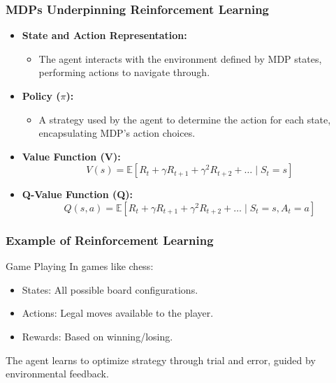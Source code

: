 \documentclass[aspectratio=169]{beamer}
\begin{document}
\begin{frame}[fragile]
    \frametitle{MDPs Underpinning Reinforcement Learning}
    \begin{itemize}
        \item \textbf{State and Action Representation:}
        \begin{itemize}
            \item The agent interacts with the environment defined by MDP states, performing actions to navigate through.
        \end{itemize}

        \item \textbf{Policy ($\pi$):}
        \begin{itemize}
            \item A strategy used by the agent to determine the action for each state, encapsulating MDP's action choices.
        \end{itemize}

        \item \textbf{Value Function (V):}
        \begin{equation}
        V(s) = \mathbb{E} \left[ R_t + \gamma R_{t+1} + \gamma^2 R_{t+2} + \ldots \mid S_t = s \right]
        \end{equation}

        \item \textbf{Q-Value Function (Q):}
        \begin{equation}
        Q(s, a) = \mathbb{E} \left[ R_t + \gamma R_{t+1} + \gamma^2 R_{t+2} + \ldots \mid S_t = s, A_t = a \right]
        \end{equation}
    \end{itemize}
\end{frame}

\begin{frame}[fragile]
    \frametitle{Example of Reinforcement Learning}
    \begin{block}{Game Playing}
        In games like chess:
        \begin{itemize}
            \item States: All possible board configurations.
            \item Actions: Legal moves available to the player.
            \item Rewards: Based on winning/losing.
        \end{itemize}
        The agent learns to optimize strategy through trial and error, guided by environmental feedback.
    \end{block}
\end{frame}
\end{document}
